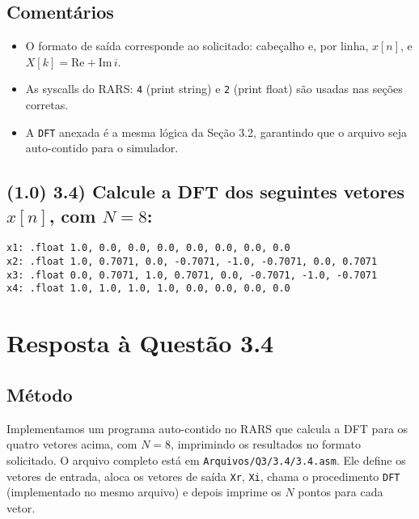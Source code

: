 \documentclass[12pt,a4paper]{article}
\begin{document}
\subsection*{Comentários}
\begin{itemize}
  \item O formato de saída corresponde ao solicitado: cabeçalho e, por linha, $x[n]$, e $X[k]=\mathrm{Re}+\mathrm{Im}\,i$.
  \item As syscalls do RARS: \texttt{4} (print string) e \texttt{2} (print float) são usadas nas seções corretas.
  \item A \texttt{DFT} anexada é a mesma lógica da Seção 3.2, garantindo que o arquivo seja auto-contido para o simulador.
\end{itemize}

\subsection*{(1.0) 3.4) Calcule a DFT dos seguintes vetores $x[n]$, com $N=8$:}
\begin{verbatim}
x1: .float 1.0, 0.0, 0.0, 0.0, 0.0, 0.0, 0.0, 0.0
x2: .float 1.0, 0.7071, 0.0, -0.7071, -1.0, -0.7071, 0.0, 0.7071
x3: .float 0.0, 0.7071, 1.0, 0.7071, 0.0, -0.7071, -1.0, -0.7071
x4: .float 1.0, 1.0, 1.0, 1.0, 0.0, 0.0, 0.0, 0.0
\end{verbatim}

\section*{Resposta à Questão 3.4}

\subsection*{Método}
Implementamos um programa auto-contido no RARS que calcula a DFT para os quatro vetores acima, com $N=8$, imprimindo os resultados no formato solicitado. O arquivo completo está em \texttt{Arquivos/Q3/3.4/3.4.asm}. Ele define os vetores de entrada, aloca os vetores de saída \texttt{Xr}, \texttt{Xi}, chama o procedimento \texttt{DFT} (implementado no mesmo arquivo) e depois imprime os $N$ pontos para cada vetor.
\end{document}
